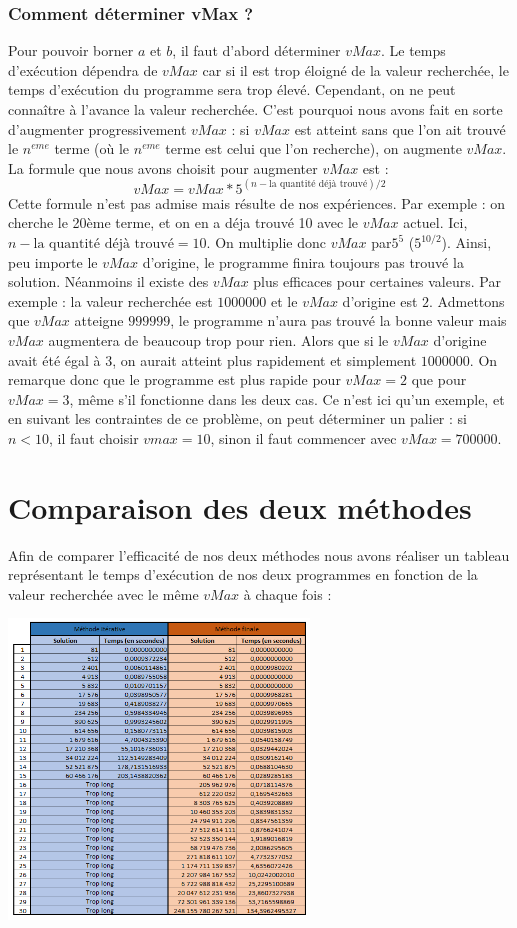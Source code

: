\documentclass{article}
\begin{document}
\section{Comment déterminer vMax ?}

Pour pouvoir borner $a$ et $b$, il faut d'abord déterminer $vMax$. Le temps d'exécution dépendra de $vMax$ car si il est trop éloigné de la valeur recherchée, le temps d'exécution du programme sera trop élevé. Cependant, on ne peut connaître à l'avance la valeur recherchée. C'est pourquoi nous avons fait en sorte d'augmenter progressivement $vMax$ : si $vMax$ est atteint sans que l'on ait trouvé le $n^{eme}$ terme (où le $n^{eme}$ terme est celui que l'on recherche), on augmente $vMax$. La formule que nous avons choisit pour augmenter $vMax$ est : \[vMax = vMax * 5^{(n - \text{la quantité déjà trouvé})/2}\] Cette formule n'est pas admise mais résulte de nos expériences. Par exemple : on cherche le 20ème terme, et on en a déja trouvé 10 avec le $vMax$ actuel. Ici, $n - \text{la quantité déjà trouvé} = 10$. On multiplie donc $vMax$ par$5^{5}$ ($5^{10/2}$). Ainsi, peu importe le $vMax$ d'origine, le programme finira toujours pas trouvé la solution. Néanmoins il existe des $vMax$ plus efficaces pour certaines valeurs. Par exemple : la valeur recherchée est $1 000 000$ et le $vMax$ d'origine est $2$. Admettons que $vMax$ atteigne $999 999$, le programme n'aura pas trouvé la bonne valeur mais $vMax$ augmentera de beaucoup trop pour rien. Alors que si le $vMax$ d'origine avait été égal à $3$, on aurait atteint plus rapidement et simplement $1 000 000$. On remarque donc que le programme est plus rapide pour $vMax = 2$ que pour $vMax = 3$, même s'il fonctionne dans les deux cas. Ce n'est ici qu'un exemple, et en suivant les contraintes de ce problème, on peut déterminer un palier : si $n < 10$, il faut choisir $vmax = 10$, sinon il faut commencer avec $vMax = 700 000$.

\part{Comparaison des deux méthodes}
Afin de comparer l'efficacité de nos deux méthodes nous avons réaliser un tableau représentant le temps d'exécution de nos deux programmes en fonction de la valeur recherchée avec le même $vMax$ à chaque fois :

\bigbreak
\begin{center}
\includegraphics[width = 8cm]{Tableau.png}
\end{center}
\bigbreak
\end{document}
